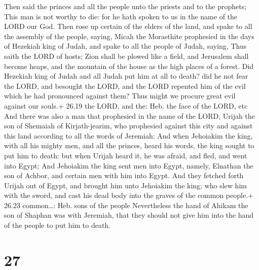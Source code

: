  Then said the princes and all the people unto the
priests and to the prophets; This man is not worthy to die: for he hath
spoken to us in the name of the LORD our God.  Then rose up
certain of the elders of the land, and spake to all the assembly of the
people, saying,  Micah the Morasthite prophesied in the
days of Hezekiah king of Judah, and spake to all the people of Judah,
saying, Thus saith the LORD of hosts; Zion shall be plowed like a field,
and Jerusalem shall become heaps, and the mountain of the house as the
high places of a forest.  Did Hezekiah king of Judah and
all Judah put him at all to death? did he not fear the LORD, and
besought the LORD, and the LORD repented him of the evil which he had
pronounced against them? Thus might we procure great evil against our
souls.+ 26.19 the LORD, and the: Heb. the face of the LORD, etc
 And there was also a man that prophesied in the name of
the LORD, Urijah the son of Shemaiah of Kirjath-jearim, who prophesied
against this city and against this land according to all the words of
Jeremiah:  And when Jehoiakim the king, with all his mighty
men, and all the princes, heard his words, the king sought to put him to
death: but when Urijah heard it, he was afraid, and fled, and went into
Egypt;  And Jehoiakim the king sent men into Egypt, namely,
Elnathan the son of Achbor, and certain men with him into Egypt.
 And they fetched forth Urijah out of Egypt, and brought
him unto Jehoiakim the king; who slew him with the sword, and cast his
dead body into the graves of the common people.+ 26.23 common\ldots:
Heb. sons of the people  Nevertheless the hand of Ahikam
the son of Shaphan was with Jeremiah, that they should not give him into
the hand of the people to put him to death.

\hypertarget{section-26}{%
\section{27}\label{section-26}}

